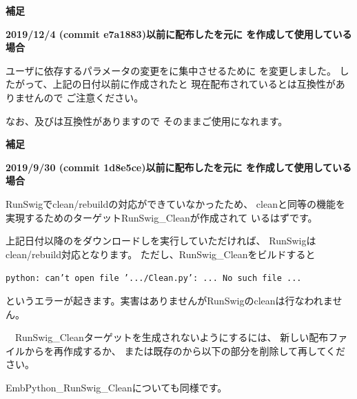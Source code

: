 \bigskip
\bigskip
\noindent
\thinrule{\linewidth}
\noindent
\bf{補足}　
\begin{narrow}
	\bf{2019/12/4 (commit e7a1883)以前に配布したを元に
	\CMakeLists{}を作成して使用している場合}

	\medskip
	ユーザに依存するパラメータの変更を\CMakeSettings{}に集中させるために
	\CMakeLists{}を変更しました。
	したがって、上記の日付以前に作成された\CMakeLists{}と
	現在配布されているとは互換性がありませんので
	ご注意ください。

	なお、\CMakeOpts{}及び\CMakeConf{}は互換性がありますので
	そのままご使用になれます。
\end{narrow}

\bigskip
\bigskip
\noindent
\thinrule{\linewidth}
\noindent
\bf{補足}　
\begin{narrow}
	\bf{2019/9/30 (commit 1d8e5ce)以前に配布したを元に
	\CMakeLists{}を作成して使用している場合}

	\medskip
	RunSwigでclean/rebuildの対応ができていなかったため、
	cleanと同等の機能を実現するためのターゲットRunSwig\_Cleanが作成されて
	いるはずです。

	上記日付以降の\SprLib をダウンロードし\cmake を実行していただければ、
	RunSwigはclean/rebuild対応となります。
	ただし、RunSwig\_Cleanをビルドすると
	\begin{narrow}
	\tt{python: can't open file '.../Clean.py': ... No such file ...}
	\end{narrow}
	というエラーが起きます。実害はありませんがRunSwigのcleanは行なわれません。

	\medskip
	　RunSwig\_Cleanターゲットを生成されないようにするには、
	新しい配布ファイルから\CMakeLists{}を再作成するか、
	または既存の\CMakeLists{}から以下の部分を削除して再\cmake してください。

	\begin{narrow}\begin{figure}[h]
	    \begin{narrow}[30pt]
		\begin{center}\end{center}
		\label{fig:SpringheadLibraryTree}
	    \end{narrow}
	\end{figure}\end{narrow}
	
	EmbPython\_RunSwig\_Cleanについても同様です。	
	
\end{narrow}


